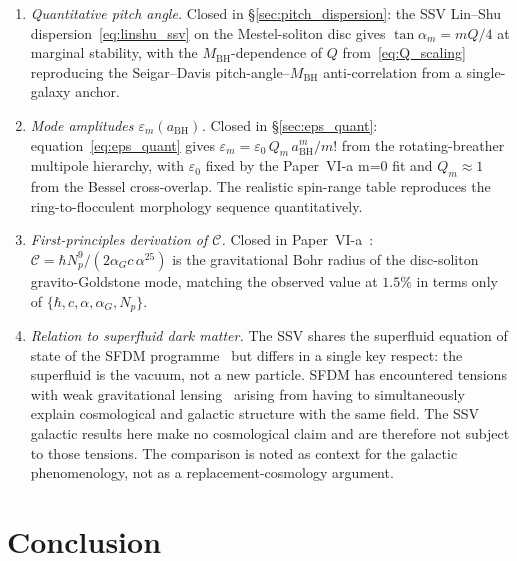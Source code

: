 \documentclass[11pt,a4paper]{article}
\begin{document}
\begin{enumerate}
  \item \emph{Quantitative pitch angle.}  Closed in
    \S\ref{sec:pitch_dispersion}: the SSV Lin--Shu
    dispersion~\eqref{eq:linshu_ssv} on the Mestel-soliton disc gives
    $\tan\alpha_m = mQ/4$ at marginal stability, with the
    $M_\mathrm{BH}$-dependence of $Q$ from~\eqref{eq:Q_scaling} reproducing
    the Seigar--Davis pitch-angle--$M_\mathrm{BH}$ anti-correlation from a
    single-galaxy anchor.

  \item \emph{Mode amplitudes $\varepsilon_m(a_\mathrm{BH})$.}  Closed in
    \S\ref{sec:eps_quant}: equation~\eqref{eq:eps_quant} gives
    $\varepsilon_m = \varepsilon_0\,Q_m\,a_\mathrm{BH}^m/m!$ from the
    rotating-breather multipole hierarchy, with $\varepsilon_0$ fixed by the
    Paper~VI-a m=0 fit and $Q_m\approx 1$ from the Bessel cross-overlap.  The
    realistic spin-range table reproduces the ring-to-flocculent morphology
    sequence quantitatively.

  \item \emph{First-principles derivation of $\mathcal{C}$.}  Closed in
    Paper~VI-a~\cite[\S4.4]{SSV-VIa}: $\mathcal{C} = \hbar N_p^9/(2\alpha_G c\,
    \alpha^{25})$ is the gravitational Bohr radius of the disc-soliton
    gravito-Goldstone mode, matching the observed value at $1.5\%$ in terms
    only of $\{\hbar,c,\alpha,\alpha_G,N_p\}$.

  \item \emph{Relation to superfluid dark matter.}  The SSV shares the superfluid
    equation of state of the SFDM programme~\cite{berezhiani2015} but differs in a single
    key respect: the superfluid is the vacuum, not a new particle.  SFDM has encountered
    tensions with weak gravitational lensing~\cite{mistele2023} arising from having to
    simultaneously explain cosmological and galactic structure with the same field.  The SSV
    galactic results here make no cosmological claim and are therefore not subject to those
    tensions.  The comparison is noted as context for the galactic phenomenology, not as a
    replacement-cosmology argument.
\end{enumerate}

\section{Conclusion}
\label{sec:conclusion}
\end{document}
